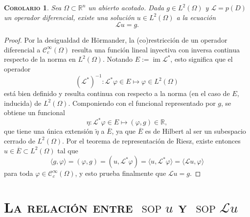 \documentclass[11pt]{article}
\theoremstyle{colored}
\DeclareMathOperator{\sop}{sop}
\newtheorem{corollary}{\scshape Corolario}
\newcommand{\R}{\mathbb{R}}
\newcommand{\C}{\mathscr{C}}
\newcommand{\im}{\operatorname{im}}
\newcommand{\ev}[1]{\langle #1 \rangle}
\newcommand{\ip}[1]{( #1 )}
\renewcommand{\L}{\mathscr{L}}
\begin{document}
\begin{corollary} Sea $\Omega \subset \R^n$ un abierto acotado. Dada $g \in L^2(\Omega)$ y $\L = p(D)$ un operador diferencial, existe una solución $u \in L^2(\Omega)$ a la ecuación
\[
\L u = g.
\]
\end{corollary}
\begin{proof} Por la desigualdad de Hörmander, la (co)restricción de un operador diferencial a $\C_c^\infty(\Omega)$ resulta una función lineal inyectiva con inversa continua respecto de la norma en $L^2(\Omega)$. Notando $E := \im \L^\ast$, esto significa que el operador
\[
(\L^\ast)^{-1} : \L^\ast \varphi \in E \mapsto \varphi \in L^2(\Omega)
\]
está bien definido y resulta continua con respecto a la norma (en el caso de $E$, inducida) de $L^2(\Omega)$. Componiendo con el funcional representado por $g$, se obtiene un funcional
\[
\eta  : \L^\ast\varphi \in E \mapsto \ip{\varphi, g} \in \R,
\]
que tiene una única extensión $\widetilde{\eta}$ a $\overline{E}$, ya que $\overline{E}$ es de Hilbert al ser un subespacio cerrado de $L^2(\Omega)$. Por el teorema de representación de Riesz, existe entonces $u \in \overline{E} \subset L^2(\Omega)$ tal que
\[
\ev{g,\varphi} = (\varphi,g) = (u,\L^\ast\varphi) = \ev{u,\L^\ast\varphi} = \ev{\L u, \varphi}
\]
para toda $\varphi \in \C_c^\infty(\Omega)$, y esto prueba finalmente que $\L u = g$.
\end{proof}

\section{\scshape La relación entre $\sop u$ y $\sop \L u$}
\end{document}
